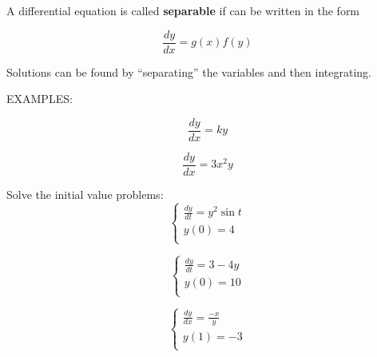 \documentclass[11pt]{article}
\begin{document}
A differential equation is called {\bf separable} if can be written in the form

\begin{displaymath}
  \frac{dy}{dx} = g(x)f(y)
\end{displaymath}

\vspace{0.2in}
Solutions can be found by ``separating'' the variables and then integrating.\\

\vspace{2.5in}

EXAMPLES:

\begin{displaymath}
  \frac{dy}{dx} = ky
\end{displaymath}

\vspace{2in}

\begin{displaymath}
  \frac{dy}{dx} = 3x^2y
\end{displaymath}

\pagebreak

Solve the initial value problems:\\

\begin{displaymath}
  \left\{ \begin{array}{ll}
  \frac{dy}{dt} = y^2\sin{t} \\
y(0) = 4 \\
\end{array} \right.
\end{displaymath}

\vspace{2in}

\begin{displaymath}
  \left\{ \begin{array}{ll}
  \frac{dy}{dt} = 3-4y\\
y(0) = 10 \\
\end{array} \right.
\end{displaymath}

\vspace{2.5in}


\begin{displaymath}
  \left\{ \begin{array}{ll}
  \frac{dy}{dx} = \frac{-x}{y} \\
y(1) = -3 \\
\end{array} \right.
\end{displaymath}
\end{document}
